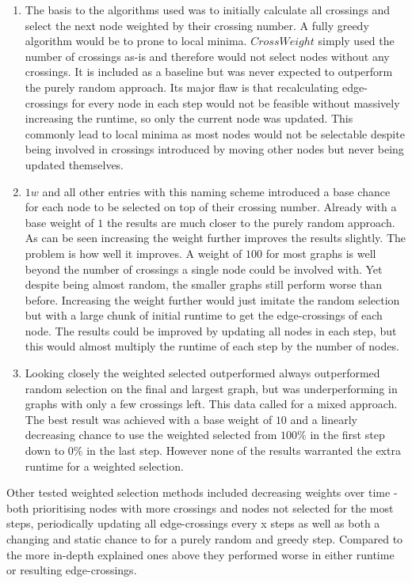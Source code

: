 \documentclass[]{llncs}
\begin{document}
	\begin{enumerate}
		\item The basis to the algorithms used was to initially calculate all crossings and select the next node weighted by their crossing number. A fully greedy algorithm would be to prone to local minima. $CrossWeight$ simply used the number of crossings as-is and therefore would not select nodes without any crossings. It is included as a baseline but was never expected to outperform the purely random approach. Its major flaw is that recalculating edge-crossings for every node in each step would not be feasible without massively increasing the runtime, so only the current node was updated. This commonly lead to local minima as most nodes would not be selectable despite being involved in crossings introduced by moving other nodes but never being updated themselves.
		\item $1w$ and all other entries with this naming scheme introduced a base chance for each node to be selected on top of their crossing number. Already with a base weight of $1$ the results are much closer to the purely random approach. As can be seen increasing the weight further improves the results slightly. The problem is how well it improves. A weight of $100$ for most graphs is well beyond the number of crossings a single node could be involved with. Yet despite being almost random, the smaller graphs still perform worse than before. Increasing the weight further would just imitate the random selection but with a large chunk of initial runtime to get the edge-crossings of each node. The results could be improved by updating all nodes in each step, but this would almost multiply the runtime of each step by the number of nodes.
		\item Looking closely the weighted selected outperformed always outperformed random selection on the final and largest graph, but was underperforming in graphs with only a few crossings left. This data called for a mixed approach. The best result was achieved with a base weight of $10$ and a linearly decreasing chance to use the weighted selected from $100\%$ in the first step down to $0\%$ in the last step. However none of the results warranted the extra runtime for a weighted selection.
	\end{enumerate}
	Other tested weighted selection methods included decreasing weights over time - both prioritising nodes with more crossings and nodes not selected for the most steps, periodically updating all edge-crossings every x steps as well as both a changing and static chance to for a purely random and greedy step. Compared to the more in-depth explained ones above they performed worse in either runtime or resulting edge-crossings.
\end{document}
